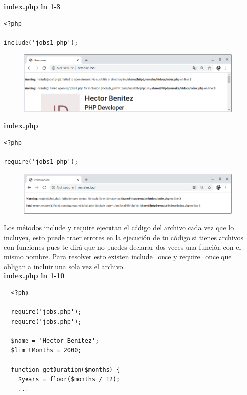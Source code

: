\documentclass{article}
\begin{document}
\textbf{index.php ln 1-3}
\begin{verbatim}
<?php

include('jobs1.php');
\end{verbatim}

\begin{figure}[h!]
  \centering
  \includegraphics[scale=0.5]{./Pictures/038_include_warning.png}
\end{figure}

\textbf{index.php}
\begin{verbatim}
<?php

require('jobs1.php');
\end{verbatim}

\newpage

\begin{figure}[h!]
  \centering
  \includegraphics[scale=0.5]{./Pictures/039_require_warning.png}
\end{figure}

Los métodos include y require ejecutan el código del archivo cada vez que lo
incluyen, esto puede traer errores en la ejecución de tu código si tienes
archivos con funciones pues te dirá que no puedes declarar dos veces una
función con el mismo nombre. Para resolver esto existen include\_once y
require\_once que obligan a incluir una sola vez el archivo.\\

\textbf{index.php ln 1-10}
\begin{verbatim}
  <?php

  require('jobs.php');
  require('jobs.php');

  $name = 'Hector Benitez';
  $limitMonths = 2000;

  function getDuration($months) {
    $years = floor($months / 12);
    ...
\end{verbatim}
\end{document}
